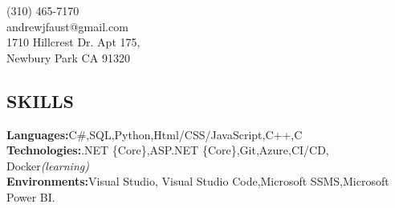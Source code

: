\documentclass[margin,line,11pt]{resume}
\begin{document}
{
	\sc
    \hfill (310) 465-7170                  \vspace{0mm}\\\vspace{0mm}%
    \hfill andrewjfaust@gmail.com           \vspace{0mm}\\\vspace{0mm}%
    \hfill 1710 Hillcrest Dr. Apt 175,\vspace{0mm}\\\vspace{0mm}
    \hfill Newbury Park CA 91320\vspace{0mm}\\\vspace{-10mm}%
}

\begin{resume}

\vspace{1mm}

    \section{\mysidestyle \textbf{\large{S}\small{KILLS}}}

    \textbf{Languages:}\hspace{2mm}C\#,\hspace{2mm}SQL,\hspace{2mm}Python,\hspace{2mm}Html/CSS/JavaScript,\hspace{2mm}C++,\hspace{2mm}C\\
    \textbf{Technologies:}\hspace{2mm}.NET \{Core\},\hspace{2mm}ASP.NET \{Core\},\hspace{2mm}Git,\hspace{2mm}Azure,\hspace{2mm}CI/CD, Docker\textsl{(learning)}\\
    \textbf{Environments:}\hspace{2mm}Visual Studio,\hspace{1mm} Visual Studio Code,\hspace{2mm}Microsoft SSMS,\hspace{2mm}Microsoft Power BI.
\sectionline


\end{resume}
\end{document}
